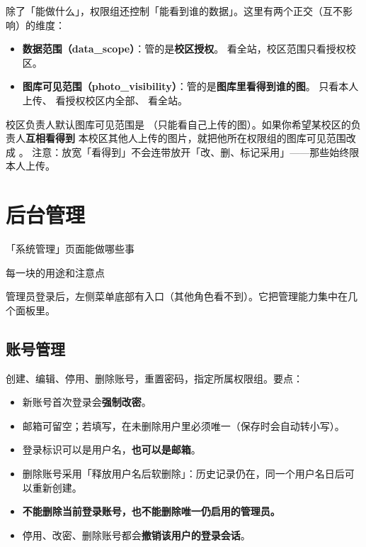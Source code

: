 \documentclass[cn,11pt,green]{elegantbook}
\begin{document}
除了「能做什么」，权限组还控制「能看到谁的数据」。这里有两个正交（互不影响）的维度：

\begin{itemize}
  \item \textbf{数据范围（data\_scope）}：管的是\textbf{校区授权}。 看全站，校区范围只看授权校区。
  \item \textbf{图库可见范围（photo\_visibility）}：管的是\textbf{图库里看得到谁的图}。 只看本人上传、
     看授权校区内全部、 看全站。
\end{itemize}

\begin{tipbox}[一个常见的调整场景]
  校区负责人默认图库可见范围是 （只能看自己上传的图）。如果你希望某校区的负责人\textbf{互相看得到}
  本校区其他人上传的图片，就把他所在权限组的图库可见范围改成 。
  注意：放宽「看得到」不会连带放开「改、删、标记采用」——那些始终限本人上传。
\end{tipbox}

\chapter{后台管理}

\begin{introduction}
  \item 「系统管理」页面能做哪些事
  \item 每一块的用途和注意点
\end{introduction}

管理员登录后，左侧菜单底部有入口（其他角色看不到）。它把管理能力集中在几个面板里。

\section{账号管理}

创建、编辑、停用、删除账号，重置密码，指定所属权限组。要点：

\begin{itemize}
  \item 新账号首次登录会\textbf{强制改密}。
  \item 邮箱可留空；若填写，在未删除用户里必须唯一（保存时会自动转小写）。
  \item 登录标识可以是用户名，\textbf{也可以是邮箱}。
  \item 删除账号采用「释放用户名后软删除」：历史记录仍在，同一个用户名日后可以重新创建。
  \item \textbf{不能删除当前登录账号，也不能删除唯一仍启用的管理员。}
  \item 停用、改密、删除账号都会\textbf{撤销该用户的登录会话}。
\end{itemize}
\end{document}
